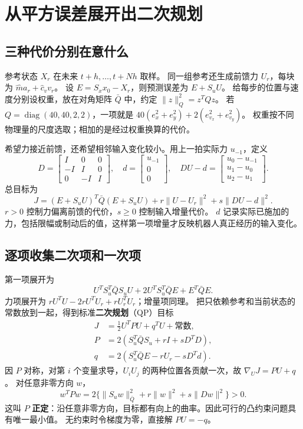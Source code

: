 \section{从平方误差展开出二次规划}
\subsection{三种代价分别在意什么}
参考状态 $X_r$ 在未来 $t+h,\ldots,t+Nh$ 取样。
同一组参考还生成前馈力 $U_r$，每块为 $\hat m a_r+\hat c_vv_r$。
设 $E=S_xx_0-X_r$，则预测误差为 $E+S_uU$。
给每步的位置与速度分别设权重，放在对角矩阵 $\bar Q$ 中，约定 $\|z\|_Q^2=z^TQz$。
若 $Q=\operatorname{diag}(40,40,2,2)$，一项就是 $40(e_x^2+e_y^2)+2(e_{v_x}^2+e_{v_y}^2)$。
权重按不同物理量的尺度选取；相加的是经过权重换算的代价。

希望力接近前馈，还希望相邻输入变化较小。用上一拍实际力 $u_{-1}$，定义
\[
 D=\begin{bmatrix}I&0&0\\-I&I&0\\0&-I&I\end{bmatrix},\quad
 d=\begin{bmatrix}u_{-1}\\0\\0\end{bmatrix},\quad
 DU-d=\begin{bmatrix}u_0-u_{-1}\\u_1-u_0\\u_2-u_1\end{bmatrix}.
\]
总目标为
\begin{equation}
 J=(E+S_uU)^T\bar Q(E+S_uU)+r\|U-U_r\|^2+s\|DU-d\|^2.\label{eq:mpccost}
\end{equation}
$r>0$ 控制力偏离前馈的代价，$s\geq0$ 控制输入增量代价。
$d$ 记录实际已施加的力，包括限幅或制动后的值，这样第一项增量才反映机器人真正经历的输入变化。

\subsection{逐项收集二次项和一次项}
第一项展开为
\[
 U^TS_u^T\bar Q S_uU+2U^TS_u^T\bar Q E+E^T\bar Q E.
\]
力项展开为 $rU^TU-2rU^TU_r+rU_r^TU_r$；增量项同理。
把只依赖参考和当前状态的常数放到一起，得到标准\textbf{二次规划}（QP）目标
\begin{align}
 J&=\tfrac12U^TPU+q^TU+\text{常数},\\
 P&=2(S_u^T\bar Q S_u+rI+sD^TD),\label{eq:mpchessian}\\
 q&=2(S_u^T\bar Q E-rU_r-sD^Td).
\end{align}
因 $P$ 对称，对第 $i$ 个变量求导，$U_iU_j$ 的两种位置各贡献一次，故 $\nabla_U J=PU+q$。
对任意非零方向 $w$，
\[
 w^TPw=2\{\|S_uw\|_{\bar Q}^2+r\|w\|^2+s\|Dw\|^2\}>0.
\]
这叫 $P$ \textbf{正定}：沿任意非零方向，目标都有向上的曲率。因此可行的凸约束问题具有唯一最小值。
无约束时令梯度为零，直接解 $PU=-q$。

